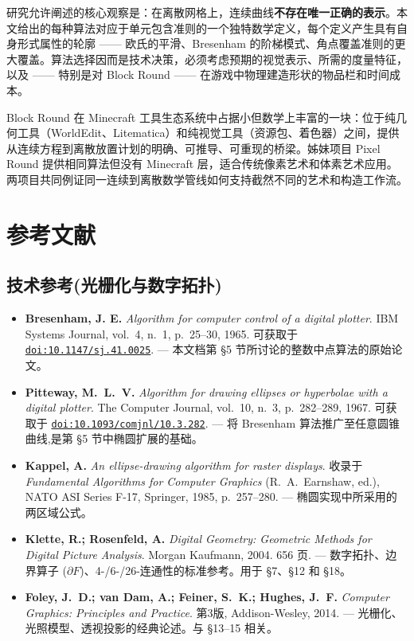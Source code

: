 \documentclass[12pt,a4paper]{scrartcl}
\newcommand{\acc}[1]{\textcolor{accent}{\textbf{#1}}}
\newcommand{\biblink}[2]{\href{#1}{\nolinkurl{#2}}}
\begin{document}
研究允许阐述的核心观察是：在离散网格上，连续曲线\acc{不存在唯一正确的表示}。本文给出的每种算法对应于单元包含准则的一个独特数学定义，每个定义产生具有自身形式属性的轮廓 —— 欧氏的平滑、Bresenham 的阶梯模式、角点覆盖准则的更大覆盖。算法选择因而是技术决策，必须考虑预期的视觉表示、所需的度量特征，以及 —— 特别是对 Block Round —— 在游戏中物理建造形状的物品栏和时间成本。

Block Round 在 Minecraft 工具生态系统中占据小但数学上丰富的一块：位于纯几何工具（WorldEdit、Litematica）和纯视觉工具（资源包、着色器）之间，提供从连续方程到离散放置计划的明确、可推导、可重现的桥梁。姊妹项目 Pixel Round 提供相同算法但没有 Minecraft 层，适合传统像素艺术和体素艺术应用。两项目共同例证同一连续到离散数学管线如何支持截然不同的艺术和构造工作流。

\section*{\color{accent}参考文献}
\label{sec:bib}

\subsection*{技术参考(光栅化与数字拓扑)}

\begin{itemize}[leftmargin=1.4em,itemsep=0.3em,topsep=0.3em]
  \item \textbf{Bresenham, J. E.} \emph{Algorithm for computer control of a digital plotter}.
        IBM Systems Journal, vol.~4, n.~1, p.~25--30, 1965.
        可获取于 \biblink{https://doi.org/10.1147/sj.41.0025}{doi:10.1147/sj.41.0025}.
        --- 本文档第 §5 节所讨论的整数中点算法的原始论文。

  \item \textbf{Pitteway, M.~L.~V.} \emph{Algorithm for drawing ellipses or hyperbolae
        with a digital plotter}. The Computer Journal, vol.~10, n.~3, p.~282--289, 1967.
        可获取于 \biblink{https://doi.org/10.1093/comjnl/10.3.282}{doi:10.1093/comjnl/10.3.282}.
        --- 将 Bresenham 算法推广至任意圆锥曲线,是第 §5 节中椭圆扩展的基础。

  \item \textbf{Kappel, A.} \emph{An ellipse-drawing algorithm for raster displays}.
        收录于 \emph{Fundamental Algorithms for Computer Graphics} (R.~A.~Earnshaw, ed.),
        NATO ASI Series F-17, Springer, 1985, p.~257--280.
        --- 椭圆实现中所采用的两区域公式。

  \item \textbf{Klette, R.; Rosenfeld, A.} \emph{Digital Geometry: Geometric Methods
        for Digital Picture Analysis}. Morgan Kaufmann, 2004. 656 页.
        --- 数字拓扑、边界算子 ($\partial F$)、4-/6-/26-连通性的标准参考。用于 §7、§12 和 §18。

  \item \textbf{Foley, J.~D.; van Dam, A.; Feiner, S.~K.; Hughes, J.~F.}
        \emph{Computer Graphics: Principles and Practice}. 第3版, Addison-Wesley, 2014.
        --- 光栅化、光照模型、透视投影的经典论述。与 §13--15 相关。
\end{itemize}
\end{document}
